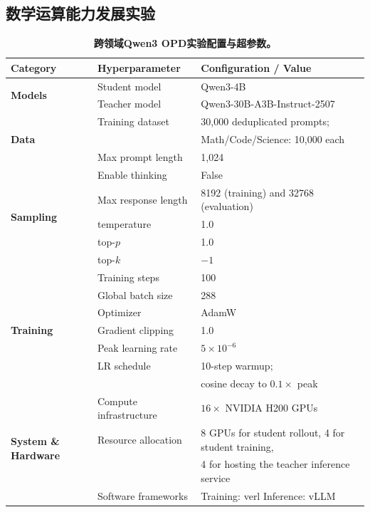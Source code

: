 \subsection{数学运算能力发展实验}
\label{app:math-learning-trajectories}

\begin{table}[t]
\caption{\textbf{跨领域Qwen3 OPD实验配置与超参数。}}
\label{tab:qwen3-opd-hyperparameters}
\centering
\small
\renewcommand{\arraystretch}{1.18}
\setlength{\tabcolsep}{6pt}
\begin{tabular}{@{}lll@{}}
\toprule
\textbf{Category} & \textbf{Hyperparameter} & \textbf{Configuration / Value} \\
\midrule
\multirow{2}{*}{\textbf{Models}}
& Student model & Qwen3-4B \\
& Teacher model & Qwen3-30B-A3B-Instruct-2507 \\
\midrule
\multirow{3}{*}{\textbf{Data}}
& Training dataset & 30,000 deduplicated prompts; \\
& & Math/Code/Science: 10,000 each \\
& Max prompt length & 1,024 \\
\midrule
\multirow{5}{*}{\textbf{Sampling}}
& Enable thinking & False \\
& Max response length & 8192 (training) and 32768 (evaluation) \\
& temperature & 1.0 \\
& top-$p$ & 1.0 \\
& top-$k$ & $-1$ \\
\midrule
\multirow{7}{*}{\textbf{Training}}
& Training steps & 100 \\
& Global batch size & 288 \\
& Optimizer & AdamW \\
& Gradient clipping & 1.0 \\
& Peak learning rate & $5\times10^{-6}$ \\
& LR schedule & 10-step warmup; \\
& & cosine decay to $0.1\times$ peak \\
\midrule
\multirow{4}{*}{\textbf{System \& Hardware}}
& Compute infrastructure & $16\times$ NVIDIA H200 GPUs \\
& Resource allocation & 8 GPUs for student rollout, 4 for student training, \\
& & 4 for hosting the teacher inference service \\
& Software frameworks & Training: verl \quad Inference: vLLM \\
\bottomrule
\end{tabular}
\end{table}


